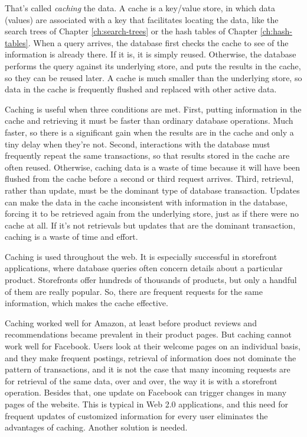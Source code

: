 That's called \emph{caching} the data.
A cache is a key/value store,
in which data (values) are associated with a key
that facilitates locating the data,
like the search trees of Chapter \ref{ch:search-trees}
or the hash tables of Chapter \ref{ch:hash-tables}.
When a query arrives, the database first checks
the cache to see of the information is already there.
If it is, it is simply reused.
Otherwise, the database performs the query against its underlying store,
and puts the results in the cache, so they can be reused later.
A cache is much smaller than the underlying store,
so data in the cache is frequently flushed and replaced with other active data.

Caching is useful when three conditions are met.
First, putting information in the cache and retrieving it
must be faster than ordinary database operations.
Much faster, so there is a significant gain
when the results are in the cache and only a tiny delay when they're not.
Second, interactions with the database must frequently repeat the same transactions,
so that results stored in the cache are often reused.
Otherwise, caching data is a waste of time because it will
have been flushed from the cache before a second or third request arrives.
Third, retrieval,
rather than update, must be the dominant type of database transaction.
Updates can make the data in the cache inconsistent with information in the database,
forcing it to be retrieved again from the underlying store,
just as if there were no cache at all.
If it's not retrievals but updates that are the dominant transaction,
caching is a waste of time and effort.

Caching is used throughout the web.
It is especially successful in storefront applications,
where database queries often concern details about a particular product.
Storefronts offer hundreds of thousands of products,
but only a handful of them are really popular.
So, there are frequent requests for the same information,
which makes the cache effective.

Caching worked well for Amazon, at least before product reviews
and recommendations became prevalent in their product pages.
But caching cannot work well for Facebook.
Users look at their welcome pages on an individual basis,
and they make frequent postings, retrieval of information
does not dominate the pattern of transactions,
and it is not the case that many incoming requests
are for retrieval of the same data, over and over,
the way it is with a storefront operation.
Besides that, one update on Facebook can trigger changes in many pages of the website.
This is typical in Web 2.0 applications,
and this need for frequent updates of customized information
for every user eliminates the advantages of caching.
Another solution is needed.

